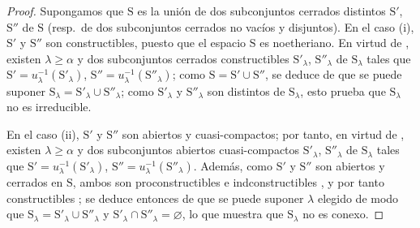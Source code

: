\begin{proof}
Supongamos que $\mathrm{S}$ es la unión de dos subconjuntos cerrados distintos $\mathrm{S}'$, $\mathrm{S}''$ de $\mathrm{S}$ (resp.\ de dos subconjuntos cerrados no vacíos y disjuntos).
En el caso (i), $\mathrm{S}'$ y $\mathrm{S}''$ son constructibles, puesto que el espacio $\mathrm{S}$ es noetheriano.
En virtud de , existen $\lambda\geqslant\alpha$ y dos subconjuntos cerrados constructibles $\mathrm{S}'_\lambda$, $\mathrm{S}''_\lambda$ de $\mathrm{S}_\lambda$ tales que $\mathrm{S}'=u_\lambda^{-1}(\mathrm{S}'_\lambda)$, $\mathrm{S}''=u_\lambda^{-1}(\mathrm{S}''_\lambda)$; como $\mathrm{S}=\mathrm{S}'\cup\mathrm{S}''$, se deduce de  que se puede suponer $\mathrm{S}_\lambda=\mathrm{S}'_\lambda\cup\mathrm{S}''_\lambda$; como $\mathrm{S}'_\lambda$ y $\mathrm{S}''_\lambda$ son distintos de $\mathrm{S}_\lambda$, esto prueba que $\mathrm{S}_\lambda$ no es irreducible.

En el caso (ii), $\mathrm{S}'$ y $\mathrm{S}''$ son abiertos y cuasi-compactos; por tanto, en virtud de , existen $\lambda\geqslant\alpha$ y dos subconjuntos abiertos cuasi-compactos $\mathrm{S}'_\lambda$, $\mathrm{S}''_\lambda$ de $\mathrm{S}_\lambda$ tales que $\mathrm{S}'=u_\lambda^{-1}(\mathrm{S}'_\lambda)$, $\mathrm{S}''=u_\lambda^{-1}(\mathrm{S}''_\lambda)$.
Además, como $\mathrm{S}'$ y $\mathrm{S}''$ son abiertos y cerrados en $\mathrm{S}$, ambos son proconstructibles e indconstructibles , y por tanto constructibles ; se deduce entonces de  que se puede suponer $\lambda$ elegido de modo que $\mathrm{S}_\lambda=\mathrm{S}'_\lambda\cup\mathrm{S}''_\lambda$ y $\mathrm{S}'_\lambda\cap\mathrm{S}''_\lambda=\varnothing$, lo que muestra que $\mathrm{S}_\lambda$ no es conexo.
\end{proof}

